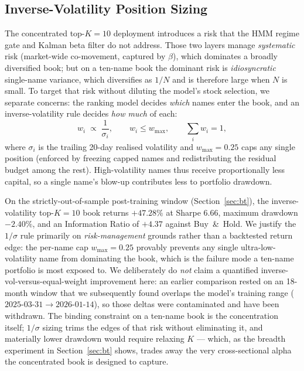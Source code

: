 \documentclass[10pt,journal,compsoc]{IEEEtran}
\begin{document}
\subsection{Inverse-Volatility Position Sizing}
The concentrated top-$K{=}10$ deployment introduces a risk that the HMM regime gate and Kalman beta filter do not address. Those two layers manage \emph{systematic} risk (market-wide co-movement, captured by $\beta$), which dominates a broadly diversified book; but on a ten-name book the dominant risk is \emph{idiosyncratic} single-name variance, which diversifies as $1/N$ and is therefore large when $N$ is small. To target that risk without diluting the model's stock selection, we separate concerns: the ranking model decides \emph{which} names enter the book, and an inverse-volatility rule decides \emph{how much} of each:
\begin{equation}
w_i \;\propto\; \frac{1}{\sigma_i}, \qquad w_i \le w_{\max},\qquad \sum_i w_i = 1,
\end{equation}
where $\sigma_i$ is the trailing 20-day realised volatility and $w_{\max}{=}0.25$ caps any single position (enforced by freezing capped names and redistributing the residual budget among the rest). High-volatility names thus receive proportionally less capital, so a single name's blow-up contributes less to portfolio drawdown.

On the strictly-out-of-sample post-training window (Section~\ref{sec:bt}), the inverse-volatility top-$K{=}10$ book returns $+47.28\%$ at Sharpe $6.66$, maximum drawdown $-2.40\%$, and an Information Ratio of $+4.37$ against Buy~\&~Hold. We justify the $1/\sigma$ rule primarily on \emph{risk-management} grounds rather than a backtested return edge: the per-name cap $w_{\max}{=}0.25$ provably prevents any single ultra-low-volatility name from dominating the book, which is the failure mode a ten-name portfolio is most exposed to. We deliberately do \emph{not} claim a quantified inverse-vol-versus-equal-weight improvement here: an earlier comparison rested on an 18-month window that we subsequently found overlaps the model's training range ($2025\text{-}03\text{-}31 \to 2026\text{-}01\text{-}14$), so those deltas were contaminated and have been withdrawn. The binding constraint on a ten-name book is the concentration itself; $1/\sigma$ sizing trims the edges of that risk without eliminating it, and materially lower drawdown would require relaxing $K$ --- which, as the breadth experiment in Section~\ref{sec:bt} shows, trades away the very cross-sectional alpha the concentrated book is designed to capture.
\end{document}
